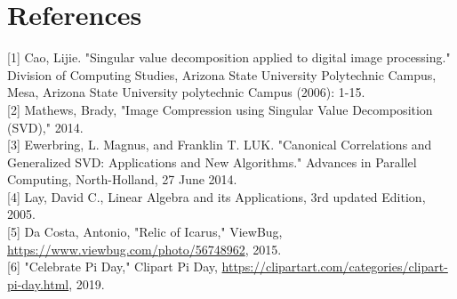 \documentclass[10pt]{article}
\begin{document}
\section*{References}
[1] Cao, Lijie. "Singular value decomposition applied to digital image processing." Division of Computing Studies, Arizona State University Polytechnic Campus, Mesa, Arizona State University polytechnic Campus (2006): 1-15.\\[0pt]
[2] Mathews, Brady, "Image Compression using Singular Value Decomposition (SVD)," 2014.\\[0pt]
[3] Ewerbring, L. Magnus, and Franklin T. LUK. "Canonical Correlations and Generalized SVD: Applications and New Algorithms." Advances in Parallel Computing, North-Holland, 27 June 2014.\\[0pt]
[4] Lay, David C., Linear Algebra and its Applications, 3rd updated Edition, 2005.\\[0pt]
[5] Da Costa, Antonio, "Relic of Icarus," ViewBug, \href{https://www.viewbug.com/photo/56748962}{https://www.viewbug.com/photo/56748962}, 2015.\\[0pt]
[6] "Celebrate Pi Day," Clipart Pi Day, \href{https://clipartart.com/categories/clipart-pi-day.html}{https://clipartart.com/categories/clipart-pi-day.html}, 2019.
\end{document}
